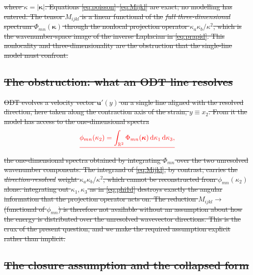 \documentclass[lineno]{JFM-FLM_Au}
\newcounter{assumption}
\providecommand{\DIFdel}[1]{{\protect\color{red}\sout{#1}}}                      %
\begin{document}
\DIFdel{where $\kappa=|\boldsymbol{\kappa}|$. Equations
\eqref{eq:poisson}--\eqref{eq:Mijkl} are exact; no modelling has entered. The
tensor $M_{ijkl}$ is a linear functional of the }\emph{\DIFdel{full three-dimensional}}
\DIFdel{spectrum $\Phi_{mn}(\boldsymbol{\kappa})$ through the nonlocal projection
operator $\kappa_a\kappa_b/\kappa^2$, which is the wavenumber-space image of
the inverse Laplacian in \eqref{eq:prapid}. This nonlocality and
three-dimensionality are the obstruction that the single-line model must
confront.
}%

\subsection{\DIFdel{The obstruction: what an ODT line resolves}}%
\addtocounter{subsection}{-1}%

\DIFdel{ODT evolves a velocity vector $\boldsymbol{u}'(y)$ on a single line aligned
with the resolved direction, here taken along the contraction axis of the
strain, $y\equiv x_2$. From it the model has access to the one-dimensional
spectra
}\begin{displaymath}
  \DIFdel{\phi_{mn}(\kappa_2)
  = \int_{\mathbb{R}^2}
      \Phi_{mn}(\boldsymbol{\kappa})\,
      \mathrm{d}\kappa_1\,\mathrm{d}\kappa_3,
}\end{displaymath}%
\DIFdel{the one-dimensional spectra obtained by integrating $\Phi_{mn}$ over the two
unresolved wavenumber components. The integrand of \eqref{eq:Mijkl}, by
contrast, carries the }\emph{\DIFdel{direction-resolved}} %
\DIFdel{weight
$\kappa_a\kappa_b/\kappa^2$, which cannot be reconstructed from
$\phi_{mn}(\kappa_2)$ alone: integrating out $\kappa_1,\kappa_3$ as in
\eqref{eq:phi1d} destroys exactly the angular information that the projection
operator acts on. The reduction $M_{ijkl}\!\to\!$ (functional of
$\phi_{mn}$) is therefore not available without an assumption about how the
energy is distributed over the unresolved wavevector directions. This is the
crux of the present question, and we make the required assumption explicit
rather than implicit.
}%

\subsection{\DIFdel{The closure assumption and the collapsed form}}
\addtocounter{subsection}{-1}%
\end{document}
